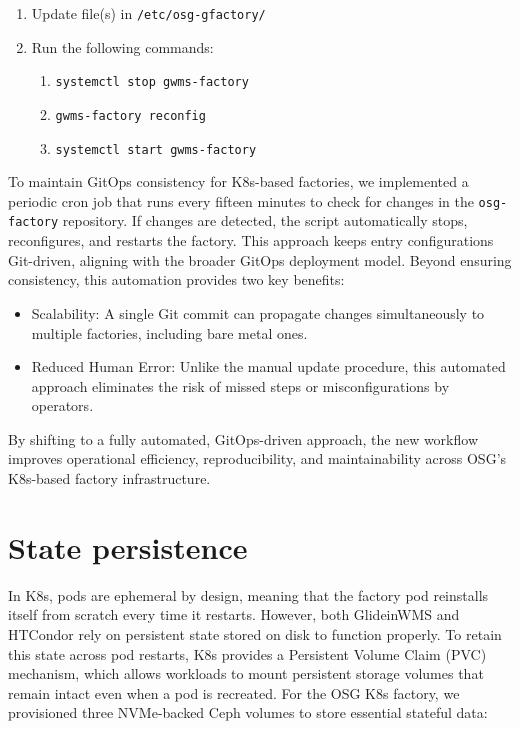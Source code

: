 \documentclass{webofc}
\begin{document}
\begin{enumerate}
\item Update file(s) in \verb"/etc/osg-gfactory/"
\item Run the following commands:
\begin{enumerate}
\item \verb"systemctl stop gwms-factory"
\item \verb"gwms-factory reconfig"
\item \verb"systemctl start gwms-factory"
\end{enumerate}
\end{enumerate}

To maintain GitOps consistency for K8s-based factories, we implemented a periodic cron job that runs every fifteen minutes to check for changes in the \verb"osg-factory" repository. If changes are detected, the script automatically stops, reconfigures, and restarts the factory. This approach keeps entry configurations Git-driven, aligning with the broader GitOps deployment model. Beyond ensuring consistency, this automation provides two key benefits:

    \begin{itemize}
        \item Scalability: A single Git commit can propagate changes simultaneously to multiple factories, including bare metal ones.
        \item Reduced Human Error: Unlike the manual update procedure, this automated approach eliminates the risk of missed steps or misconfigurations by operators.
    \end{itemize}

By shifting to a fully automated, GitOps-driven approach, the new workflow improves operational efficiency, reproducibility, and maintainability across OSG’s K8s-based factory infrastructure.

\section{State persistence}
\label{persistence}

In K8s, pods are ephemeral by design, meaning that the factory pod reinstalls itself from scratch every time it restarts. However, both GlideinWMS and HTCondor rely on persistent state stored on disk to function properly. To retain this state across pod restarts, K8s provides a Persistent Volume Claim (PVC) mechanism, which allows workloads to mount persistent storage volumes that remain intact even when a pod is recreated. For the OSG K8s factory, we provisioned three NVMe-backed Ceph volumes to store essential stateful data:
\end{document}
